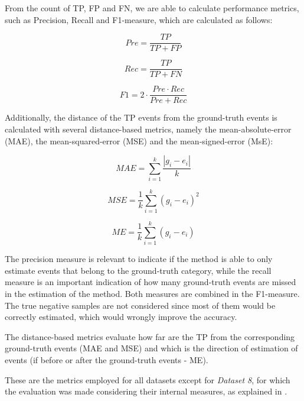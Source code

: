 
From the count of TP, FP and FN, we are able to calculate performance metrics, such as Precision, Recall and F1-measure, which are calculated as follows:

\begin{equation}
    Pre = \frac{TP}{TP+FP}
\end{equation}

\begin{equation}
    Rec = \frac{TP}{TP+FN}
\end{equation}

\begin{equation}
    F1 = 2 \cdot \frac{Pre \cdot Rec}{Pre+Rec}
\end{equation}


Additionally, the distance of the TP events from the ground-truth events is calculated with several distance-based metrics, namely the mean-absolute-error (MAE), the mean-squared-error (MSE) and the mean-signed-error (MsE):

\begin{equation}
    MAE = \sum^{k}_{i=1} \frac{|g_{i} - e_{i}|}{k}
\end{equation}

\begin{equation}
    MSE = \frac{1}{k} \sum^{k}_{i=1} (g_{i} - e_{i})^2
\end{equation}

\begin{equation}
    ME = \frac{1}{k} \sum^{k}_{i=1} (g_{i} - e_{i})
\end{equation}

The precision measure is relevant to indicate if the method is able to only estimate events that belong to the ground-truth category, while the recall measure is an important indication of how many ground-truth events are missed in the estimation of the method. Both measures are combined in the F1-measure. The true negative samples are not considered since most of them would be correctly estimated, which would wrongly improve the accuracy.
\par
The distance-based metrics evaluate how far are the TP from the corresponding ground-truth events (MAE and MSE) and which is the direction of estimation of events (if before or after the ground-truth events - ME).
\par
These are the metrics employed for all datasets except for \textit{Dataset 8}, for which the evaluation was made considering their internal measures, as explained in \cite{cpd_alan}.

